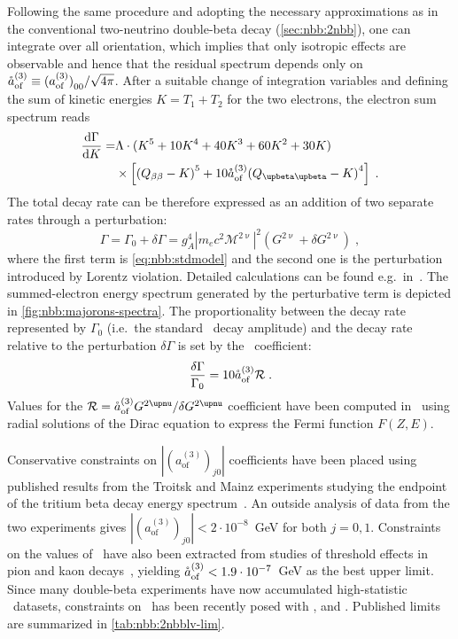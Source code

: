 Following the same procedure and adopting the necessary approximations as in the
conventional two-neutrino double-beta decay (\cref{sec:nbb:2nbb}), one can integrate over
all orientation, which implies that only isotropic effects are observable and hence that
the residual spectrum depends only on ${\mathring{a}_\text{of}^{(3)}} \equiv {{(a_\text{of}^{(3)})}_{00}}/\sqrt{4\pi}$. After a suitable
change of integration variables and defining the sum of kinetic energies $K=T_1+T_2$ for
the two electrons, the electron sum spectrum reads
\begin{equation}\label{eq:nbb:totwidth}
  \begin{split}
    \frac{\text{d}\Gamma}{\text{d}K} = &
      \Lambda \cdot (K^5 + 10K^4 + 40K^3 + 60K^2 + 30K) \\
      & \times\left[{(Q_{\beta\beta} - K)}^5 + 10 \aofM {(Q_{\upbeta\upbeta} - K)}^4\right] \;. \\
  \end{split}
\end{equation}
The total decay rate can be therefore expressed as an addition of two separate
rates through a perturbation:
\[
  \Gamma = \Gamma_0 + \delta\Gamma = g_A^4 |m_e c^2 \mathcal{M}^{2\upnu}|^2 (G^{2\upnu} +
  \delta G^{2\upnu}) \;,
\]
where the first term is \cref{eq:nbb:stdmodel} and the second one is the perturbation
introduced by Lorentz violation. Detailed calculations can be found
e.g.~in~\cite{Nitescu2020}. The summed-electron energy spectrum generated by the
perturbative term is depicted in \cref{fig:nbb:majorons-spectra}. The proportionality
between the decay rate represented by $\Gamma_0$ (i.e.~the standard \nnbb\ decay
amplitude) and the decay rate relative to the perturbation $\delta\Gamma$ is set by the
\aof\ coefficient:
\[
  \frac{\delta\Gamma}{\Gamma_0} = 10 {\mathring{a}_\text{of}^{(3)}} \mathcal{R} \;.
\]
Values for the $\mathcal{R}=\aofM G^{2\upnu} / \delta G^{2\upnu}$ coefficient have been
computed in~\cite{Nitescu2020} using radial solutions of the Dirac equation to express the
Fermi function $F(Z,E)$.

Conservative constraints on $|(a_\text{of}^{(3)})_{j0}|$ coefficients have
been placed using published results from the Troitsk and Mainz experiments
studying the endpoint of the tritium beta decay energy
spectrum~\cite{Diaz2013}. An outside analysis of data from the two experiments
gives $|(a_\text{of}^{(3)})_{j0}| < 2 \cdot 10^{-8}$~GeV for both $j=0,1$.
Constraints on the values of \aof\ have also been extracted from studies of
threshold effects in pion and kaon decays~\cite{Kostelecky2012}, yielding
${\mathring{a}_\text{of}^{(3)}} < 1.9 \cdot 10^{-7}$~GeV as the best upper limit.  Since many
double-beta experiments have now accumulated high-statistic \nnbb\ datasets,
constraints on \aof\ has been recently posed with ,  and
. Published limits are summarized in \cref{tab:nbb:2nbblv-lim}.


